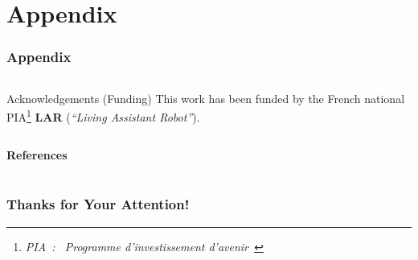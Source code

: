 \documentclass[10pt,c]{beamer}
\begin{document}

\appendix


\section{Appendix}

\begin{frame}[allowframebreaks,t]
\frametitle{Appendix}
\begin{columns}[c]
\begin{column}{8.25cm}
\begin{block}{Acknowledgements (Funding)}
This work has been funded by the French national PIA\footnote{\textsl{PIA~:
\guillemotleft~Programme d'investissement d'avenir~\guillemotright}}
\textbf{LAR} (\textit{``Living Assistant Robot''}).
\end{block}
\end{column}
\end{columns}

\vspace{0.75cm}

\textbf{References}
\vspace{0.25cm}
\tiny


\end{frame}


\section{}

\begin{frame}
\frametitle{Thanks for Your Attention!}
\begin{block}{}
\end{block}
\end{frame}



\end{document}
